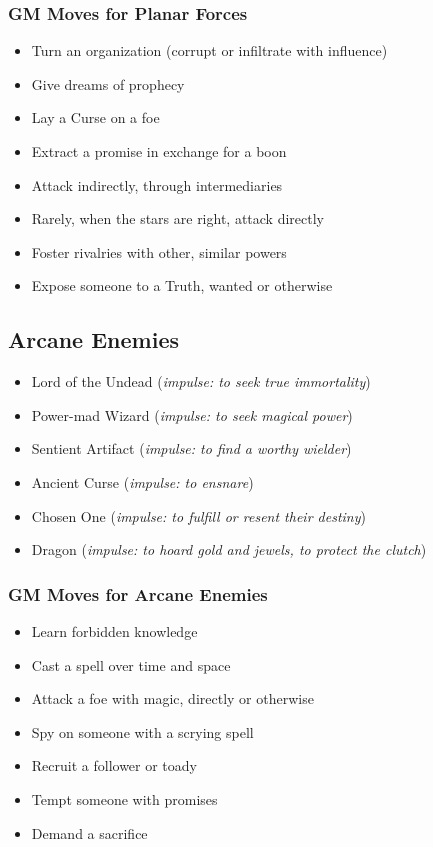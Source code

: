 \subsubsection{GM Moves for Planar Forces}
\begin{itemize}
\item Turn an organization (corrupt or infiltrate with influence)
\item Give dreams of prophecy
\item Lay a Curse on a foe
\item Extract a promise in exchange for a boon
\item Attack indirectly, through intermediaries
\item Rarely, when the stars are right, attack directly
\item Foster rivalries with other, similar powers
\item Expose someone to a Truth, wanted or otherwise

\end{itemize}
\subsection{Arcane Enemies}
\begin{itemize}
\item Lord of the Undead (\emph{impulse: to seek true immortality})
\item Power-mad Wizard (\emph{impulse: to seek magical power})
\item Sentient Artifact (\emph{impulse: to find a worthy wielder})
\item Ancient Curse (\emph{impulse: to ensnare})
\item Chosen One (\emph{impulse: to fulfill or resent their destiny})
\item Dragon (\emph{impulse: to hoard gold and jewels, to protect the clutch})

\end{itemize}
\subsubsection{GM Moves for Arcane Enemies}
\begin{itemize}
\item Learn forbidden knowledge
\item Cast a spell over time and space
\item Attack a foe with magic, directly or otherwise
\item Spy on someone with a scrying spell
\item Recruit a follower or toady
\item Tempt someone with promises
\item Demand a sacrifice

\end{itemize}
